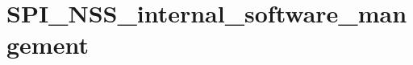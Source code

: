\hypertarget{group___s_p_i___n_s_s__internal__software__mangement}{\section{S\-P\-I\-\_\-\-N\-S\-S\-\_\-internal\-\_\-software\-\_\-mangement}
\label{group___s_p_i___n_s_s__internal__software__mangement}
}
